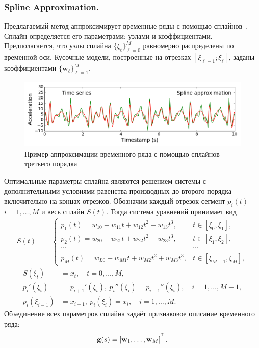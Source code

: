 \subsubsection{Spline Approximation.}
Предлагаемый метод аппроксимирует временные ряды с помощью сплайнов~\cite{deboor1978splines}. Сплайн определяется его параметрами: узлами и коэффициентами.
Предполагается, что узлы сплайна $\{\xi_\ell\}_{\ell=0}^M$ равномерно распределены по временной оси.
Кусочные модели, построенные на отрезках $[\xi_{\ell-1}; \xi_{\ell}]$, заданы коэффициентами $\{\mathbf{w}_\ell\}_{\ell=1}^{M}$.
\begin{figure}[h]
	\centering
	\includegraphics[width=1\linewidth]{figs/ch5/spline_example.png}
	\caption{Пример аппроксимации временного ряда с помощью сплайнов третьего порядка}
	\label{ch5:fig:spline_example}
\end{figure}
Оптимальные параметры сплайна являются решением системы с дополнительными условиями равенства производных до второго порядка включительно на концах отрезков.
Обозначим каждый отрезок-сегмент $p_i(t)$ $i = 1, \dots, M$ и весь сплайн $S(t)$. Тогда система уравнений принимает вид
\begin{align*}
S(t) &= \begin{cases}
p_1(t) = w_{10} +w_{11}t + w_{12}t^2 + w_{13}t^3, & t\in [\xi_0, \xi_1],\\
p_2(t) = w_{20} +w_{21}t + w_{22}t^2 + w_{23}t^3, & t\in [\xi_1, \xi_2],\\
\cdots&\cdots \\
p_{M}(t) = w_{L0} +w_{M1}t + w_{M2}t^2 + w_{M3}t^3, & t\in [\xi_{M-1}, \xi_M],					
\end{cases}
\end{align*}
\begin{align*}
S(\xi_t) &= x_t, \quad t = 0, \dots, M,\\
p_i'(\xi_i) &= p_{i+1}'(\xi_i),\: p_i''(\xi_i) = p_{i+1}''(\xi_i), \quad i = 1, \dots, M-1,\\
p_i(\xi_{i-1}) &= x_{i-1},\: p_i(\xi_i) = x_i, \quad i = 1, \dots, M.
\end{align*}
Объединение всех параметров сплайна задаёт признаковое описание временного ряда:
\[
\mathbf{g}(s) = \left[\mathbf{w}_1, \dots, \mathbf{w}_{M}\right]^{\T}.
\]

